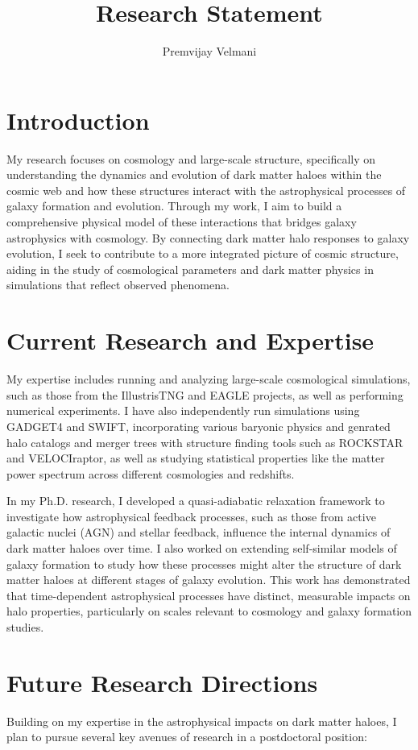 \documentclass[12pt]{article}
\title{Research Statement}
\author{Premvijay Velmani}
\begin{document}
\maketitle

\section*{Introduction}
My research focuses on cosmology and large-scale structure, specifically on understanding the dynamics and evolution of dark matter haloes within the cosmic web and how these structures interact with the astrophysical processes of galaxy formation and evolution. Through my work, I aim to build a comprehensive physical model of these interactions that bridges galaxy astrophysics with cosmology. By connecting dark matter halo responses to galaxy evolution, I seek to contribute to a more integrated picture of cosmic structure, aiding in the study of cosmological parameters and dark matter physics in simulations that reflect observed phenomena.

\section*{Current Research and Expertise}
My expertise includes running and analyzing large-scale cosmological simulations, such as those from the IllustrisTNG and EAGLE projects, as well as performing numerical experiments. I have also independently run simulations using GADGET4 and SWIFT, incorporating various baryonic physics and genrated halo catalogs and merger trees with structure finding tools such as ROCKSTAR and VELOCIraptor, as well as studying statistical properties like the matter power spectrum across different cosmologies and redshifts.

In my Ph.D. research, I developed a quasi-adiabatic relaxation framework to investigate how astrophysical feedback processes, such as those from active galactic nuclei (AGN) and stellar feedback, influence the internal dynamics of dark matter haloes over time. I also worked on extending self-similar models of galaxy formation to study how these processes might alter the structure of dark matter haloes at different stages of galaxy evolution. This work has demonstrated that time-dependent astrophysical processes have distinct, measurable impacts on halo properties, particularly on scales relevant to cosmology and galaxy formation studies.

\section*{Future Research Directions}
Building on my expertise in the astrophysical impacts on dark matter haloes, I plan to pursue several key avenues of research in a postdoctoral position:
\end{document}

